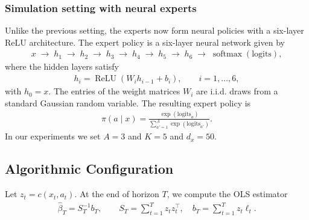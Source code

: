 \documentclass[11pt,letterpaper]{article}
\newcommand{\z}{z}
\newcommand{\loss}{\ell}
\theoremstyle{plain}
\theoremstyle{definition}  %
\begin{document}
\subsubsection*{Simulation setting with neural experts}

Unlike the previous setting, the experts now form neural policies with a six-layer ReLU architecture. The expert policy is a six-layer neural network given by
\begin{align*}
   x \;\longrightarrow\; h_1 \;\longrightarrow\; h_2 \;\longrightarrow\; h_3
\;\longrightarrow\; h_4 \;\longrightarrow\; h_5 \;\longrightarrow\; h_6
\;\longrightarrow\; \operatorname{softmax}(\text{logits}), 
\end{align*}
%
where the hidden layers satisfy
\begin{align*}
   h_i = \operatorname{ReLU}\!\left( W_i h_{i-1} + b_i \right),
\qquad i = 1,\ldots,6, 
\end{align*}
%
with \(h_0 = x\). The entries of the weight matrices $W_i$ are i.i.d. draws from a standard Gaussian random variable. 
The resulting expert policy is
\begin{align*}
    \pi(a \mid x) = \frac{\exp(\text{logits}_a)}{\sum_{a'=1}^A \exp(\text{logits}_{a'})}.
\end{align*}
In our experiments we set $A  = 3$ and $K = 5$ and $d_x = 50$. 


\subsection{Algorithmic Configuration}


\noindent  Let $\z_t = c(x_t,a_t)$.
At the end of horizon $T$, we compute the OLS estimator
\begin{align*}
    \widehat\beta_T = S_T^{-1} b_T, \qquad
    S_T = \sum_{t=1}^T \z_t \z_t^\top,\quad
    b_T = \sum_{t=1}^T \z_t \loss_t.
\end{align*}
\end{document}
